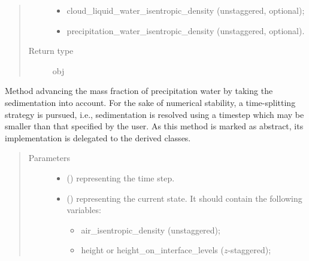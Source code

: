 \documentclass[letterpaper,10pt,english]{sphinxmanual}
\begin{document}
\begin{fulllineitems}
\begin{fulllineitems}
\begin{quote}
\begin{description}
\begin{itemize}
\item {} 
cloud\_liquid\_water\_isentropic\_density (unstaggered, optional);

\item {} 
precipitation\_water\_isentropic\_density (unstaggered, optional).

\end{itemize}


\item[{Return type}] \leavevmode
obj

\end{description}\end{quote}

\end{fulllineitems}


\begin{fulllineitems}
\label{\detokenize{api:dycore.prognostic_isentropic.PrognosticIsentropic.step_integrating_sedimentation_flux}}
Method advancing the mass fraction of precipitation water by taking the sedimentation into account.
For the sake of numerical stability, a time-splitting strategy is pursued, i.e., sedimentation is resolved
using a timestep which may be smaller than that specified by the user.
As this method is marked as abstract, its implementation is delegated to the derived classes.
\begin{quote}\begin{description}
\item[{Parameters}] \leavevmode\begin{itemize}
\item {} 
 () \textendash{}  representing the time step.

\item {} 
 () \textendash{} 
 representing the current state.
It should contain the following variables:
\begin{itemize}
\item {} 
air\_isentropic\_density (unstaggered);

\item {} 
height or height\_on\_interface\_levels (\(z\)-staggered);


\end{itemize}
\end{itemize}
\end{description}
\end{quote}
\end{fulllineitems}
\end{fulllineitems}
\end{document}
